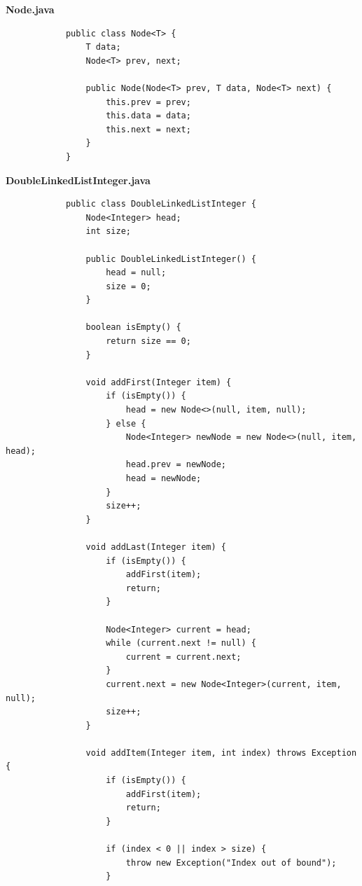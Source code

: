 \documentclass[12pt,titlepage]{article}
\begin{document}
\begin{enumerate}
{        \pagebreak

        \large{\textbf{Node.java}}
        \begin{verbatim}
            public class Node<T> {
                T data;
                Node<T> prev, next;

                public Node(Node<T> prev, T data, Node<T> next) {
                    this.prev = prev;
                    this.data = data;
                    this.next = next;
                }
            }
        \end{verbatim}

        \large{\textbf{DoubleLinkedListInteger.java}}

        \begin{verbatim}
            public class DoubleLinkedListInteger {
                Node<Integer> head;
                int size;

                public DoubleLinkedListInteger() {
                    head = null;
                    size = 0;
                }

                boolean isEmpty() {
                    return size == 0;
                }

                void addFirst(Integer item) {
                    if (isEmpty()) {
                        head = new Node<>(null, item, null);
                    } else {
                        Node<Integer> newNode = new Node<>(null, item, head);
                        head.prev = newNode;
                        head = newNode;
                    }
                    size++;
                }

                void addLast(Integer item) {
                    if (isEmpty()) {
                        addFirst(item);
                        return;
                    }

                    Node<Integer> current = head;
                    while (current.next != null) {
                        current = current.next;
                    }
                    current.next = new Node<Integer>(current, item, null);
                    size++;
                }

                void addItem(Integer item, int index) throws Exception {
                    if (isEmpty()) {
                        addFirst(item);
                        return;
                    }

                    if (index < 0 || index > size) {
                        throw new Exception("Index out of bound");
                    }


\end{verbatim}}
\end{enumerate}
\end{document}
